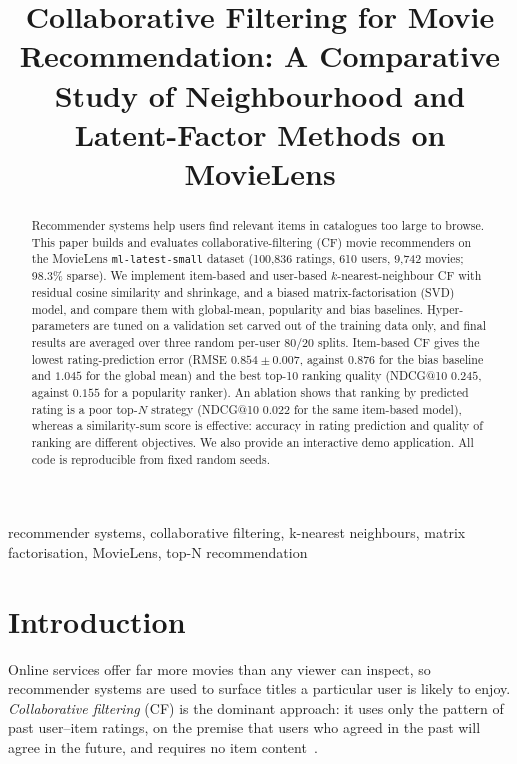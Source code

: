 \documentclass[conference]{IEEEtran}
\begin{document}
\title{Collaborative Filtering for Movie Recommendation: A Comparative Study of Neighbourhood and Latent-Factor Methods on MovieLens}

\author{
}

\maketitle

\begin{abstract}
Recommender systems help users find relevant items in catalogues too large to browse. This paper builds and evaluates collaborative-filtering (CF) movie recommenders on the MovieLens \texttt{ml-latest-small} dataset (100,836 ratings, 610 users, 9,742 movies; 98.3\% sparse). We implement item-based and user-based $k$-nearest-neighbour CF with residual cosine similarity and shrinkage, and a biased matrix-factorisation (SVD) model, and compare them with global-mean, popularity and bias baselines. Hyper-parameters are tuned on a validation set carved out of the training data only, and final results are averaged over three random per-user 80/20 splits. Item-based CF gives the lowest rating-prediction error (RMSE $0.854\pm0.007$, against $0.876$ for the bias baseline and $1.045$ for the global mean) and the best top-10 ranking quality (NDCG@10 $0.245$, against $0.155$ for a popularity ranker). An ablation shows that ranking by predicted rating is a poor top-$N$ strategy (NDCG@10 $0.022$ for the same item-based model), whereas a similarity-sum score is effective: accuracy in rating prediction and quality of ranking are different objectives. We also provide an interactive demo application. All code is reproducible from fixed random seeds.
\end{abstract}

\begin{IEEEkeywords}
recommender systems, collaborative filtering, k-nearest neighbours, matrix factorisation, MovieLens, top-N recommendation
\end{IEEEkeywords}

\section{Introduction}
Online services offer far more movies than any viewer can inspect, so recommender systems are used to surface titles a particular user is likely to enjoy. \emph{Collaborative filtering} (CF) is the dominant approach: it uses only the pattern of past user--item ratings, on the premise that users who agreed in the past will agree in the future, and requires no item content~\cite{resnick1994,aggarwal2016}.
\end{document}
